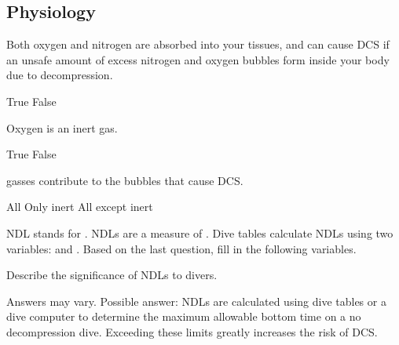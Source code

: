 \documentclass[12pt,letter]{exam}
\begin{document}
\begin{questions}
\section{Physiology}
    \question Both oxygen and nitrogen are absorbed into your tissues, and can cause DCS if an unsafe amount of excess nitrogen and oxygen bubbles form inside your body due to decompression.

    \begin{oneparcheckboxes}
        \choice True
        \CorrectChoice False
    \end{oneparcheckboxes}
    \question Oxygen is an inert gas.

    \begin{oneparcheckboxes}
        \choice True
        \CorrectChoice False
    \end{oneparcheckboxes}
    \question \fillin gasses contribute to the bubbles that cause DCS.

    \begin{oneparcheckboxes}
        \choice All
        \CorrectChoice Only inert
        \choice All except inert
    \end{oneparcheckboxes}
 
    \question NDL stands for .
    \question NDLs are a measure of \fillin[time].
    \question Dive tables calculate NDLs using two variables: \fillin[depth] and .
    \question Based on the last question, fill in the following variables.
    \question Describe the significance of NDLs to divers.
    \begin{solution}[1.5in]
       Answers may vary. Possible answer:
       NDLs are calculated using dive tables or a dive computer to determine the maximum allowable bottom time on a no decompression dive. Exceeding these limits greatly increases the risk of DCS.
    \end{solution}


\end{questions}
\end{document}
